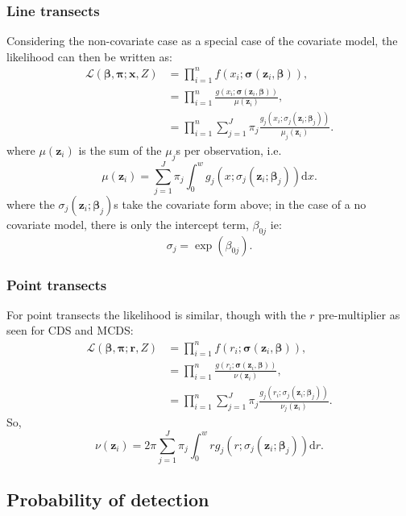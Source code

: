 \subsubsection{Line transects}
Considering the non-covariate case as a special case of the covariate model, the likelihood can then be written as:
\begin{align}
\mathcal{L}(\bm{\beta}, \bm{\pi} ; \bm{x}, Z) &= \prod_{i=1}^n f(x_i;\bm{\sigma}(\bm{z}_i, \bm{\beta})),\\
&= \prod_{i=1}^n \frac{g(x_i;\bm{\sigma}(\bm{z}_i, \bm{\beta}))}{\mu(\bm{z}_i)},\\
&= \prod_{i=1}^n \sum_{j=1}^J \pi_j \frac{g_j(x_i; \sigma_j(\bm{z}_i;\bm{\beta}_j))}{ \mu_j(\bm{z}_i)}.
\label{mmds-lt-glikelihood}
\end{align}
where $\mu(\bm{z}_i)$ is the sum of the $\mu_j$s per observation, i.e.
\begin{equation}
\mu(\bm{z}_i) = \sum_{j=1}^J \pi_j \int_0^w g_j(x; \sigma_j(\bm{z}_i;\bm{\beta}_j)) \text{d}x.
\end{equation}
where the $\sigma_j(\bm{z}_i;\bm{\beta}_j)$s take the covariate form above; in the case of a no covariate model, there is only the intercept term, $\beta_{0j}$ ie:
\begin{equation}
\sigma_j = \exp ( \beta_{0j} ).
\end{equation}

\subsubsection{Point transects}
For point transects the likelihood is similar, though with the $r$ pre-multiplier as seen for CDS and MCDS:
\begin{align}
\mathcal{L}(\bm{\beta}, \bm{\pi} ; \bm{r}, Z) &= \prod_{i=1}^n f(r_i;\bm{\sigma}(\bm{z}_i, \bm{\beta})),\\
&= \prod_{i=1}^n \frac{g(r_i;\bm{\sigma}(\bm{z}_i, \bm{\beta}))}{\nu(\bm{z}_i)},\\
&= \prod_{i=1}^n \sum_{j=1}^J \pi_j \frac{g_j(r_i; \sigma_j(\bm{z}_i;\bm{\beta}_j))}{ \nu_j(\bm{z}_i)}.
\label{mmds-pt-glikelihood}
\end{align}
So,
\begin{equation}
\nu(\bm{z}_i) = 2 \pi \sum_{j=1}^J \pi_j \int_0^w r g_j(r; \sigma_j(\bm{z}_i;\bm{\beta}_j)) \text{d}r.
\end{equation}


\subsection{Probability of detection}

